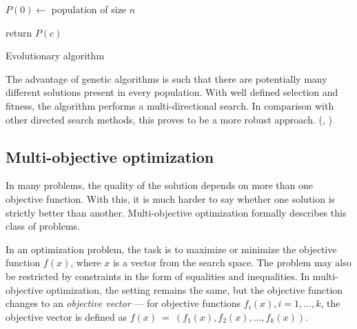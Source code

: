 \begin{algorithm}
\DontPrintSemicolon
  \;
  $P(0) \longleftarrow$ population of size $n$

  \;
  return $P(c)$  
\caption{Evolutionary algorithm\label{alg:EA}}
\end{algorithm}

The advantage of genetic algorithms is such that there are potentially 
many different solutions present in every population. With well defined 
selection and fitness, the algorithm performs a multi-directional search. 
In comparison with other directed search methods, this proves to be a more 
robust approach. (\cite{Michalewicz:1996:GAD:229930}, 
\cite{Mitchell:1997:ML:541177}) %

\subsection{Multi-objective optimization}
In many problems, the quality of the solution depends on more than one
objective function. With this, it is much harder to say whether one solution
is strictly better than another. Multi-objective optimization formally
describes this class of problems.

In an optimization problem, the task is to maximize or minimize the objective
function $f(x)$, where $x$ is a vector from the search space. The problem may
also be restricted by constraints in the form of equalities and inequalities.
In multi-objective optimization, the setting remains the same, but the
objective function changes to an \emph{objective vector} ---
for objective functions $f_i(x), i = 1,\ldots,k$, the objective vector is 
defined as $f(x)~=~(f_1(x), f_2(x), \ldots, f_k(x))$.



